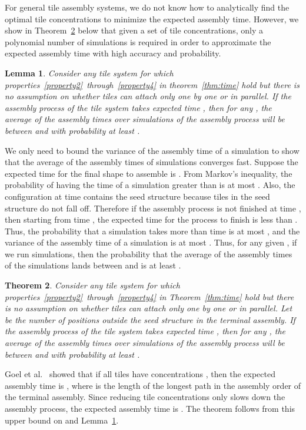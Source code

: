\documentclass[11pt]{article}
\newtheorem{theorem}{Theorem}
\newtheorem{lemma}[theorem]{Lemma}
\newenvironment{proof}{{\bf Proof:}}{\par}
\begin{document}
For general tile assembly systems, we do not know how to analytically find the optimal tile concentrations to minimize the expected assembly time. However, we show in Theorem~\ref{thm:simulation} below that given a set of tile concentrations, only a polynomial number of simulations is required in order to approximate the expected assembly time with high accuracy and probability.


\begin{lemma}
\label{lem:simulation}
Consider any tile system for which properties~\ref{property2}~through~\ref{property4} in theorem~\ref{thm:time} hold but there is no assumption on whether tiles can attach only one by one or in parallel. If the assembly process of the tile system takes expected time , then for any , the average of the assembly times over  simulations of the assembly process will be between  and  with probability at least .
\end{lemma}
\begin{proof}
We only need to bound the variance of the assembly time of a simulation to show that the average of the assembly times of simulations converges fast. Suppose the expected time for the final shape to assemble is . From Markov's inequality, the probability of having the time of a simulation greater than  is at most . Also, the configuration at time  contains the seed structure because tiles in the seed structure do not fall off. Therefore if the assembly process is not finished at time , then starting from time , the expected time for the process to finish is less than . Thus, the probability that a simulation takes more than  time is at most , and the variance of the assembly time of a simulation is at most . Thus, for any given , if we run  simulations, then the probability that the average of the assembly times of the simulations lands between  and  is at least .
\end{proof}


\begin{theorem}
\label{thm:simulation}
Consider any tile system for which properties~\ref{property2}~through~\ref{property4} in Theorem~\ref{thm:time} hold but there is no assumption on whether tiles can attach only one by one or in parallel. Let  be the number of positions outside the seed structure in the terminal assembly. If the assembly process of the tile system takes expected time , then for any , the average of the assembly times over  simulations of the assembly process will be between  and  with probability at least .
\end{theorem}
\begin{proof}
Goel et al.~\cite{cgm04:optcounter} showed that if all tiles have concentrations , then the expected assembly time is , where  is the length of the longest path in the assembly order of the terminal assembly. Since reducing tile concentrations only slows down the assembly process, the expected assembly time  is . The theorem follows from this upper bound on  and Lemma~\ref{lem:simulation}.
\end{proof}
\end{document}
